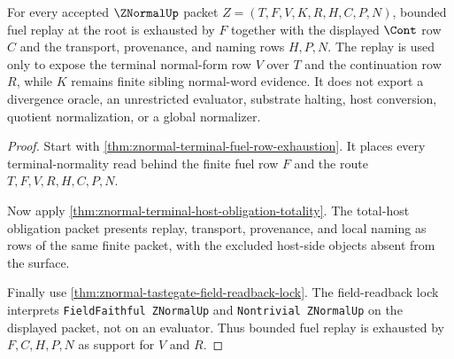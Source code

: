 \begin{theorem}
\label{thm:znormal-root-fuel-replay-exhaustion}
For every accepted $\ZNormalUp$ packet $Z=(T,F,V,K,R,H,C,P,N)$, bounded fuel replay at the root is exhausted by $F$ together with the displayed $\Cont$ row $C$ and the transport, provenance, and naming rows $H,P,N$. The replay is used only to expose the terminal normal-form row $V$ over $T$ and the continuation row $R$, while $K$ remains finite sibling normal-word evidence. It does not export a divergence oracle, an unrestricted evaluator, substrate halting, host conversion, quotient normalization, or a global normalizer.
\end{theorem}
\begin{proof}
Start with \autoref{thm:znormal-terminal-fuel-row-exhaustion}. It places every terminal-normality read behind the finite fuel row $F$ and the route $T,F,V,R,H,C,P,N$.

Now apply \autoref{thm:znormal-terminal-host-obligation-totality}. The total-host obligation packet presents replay, transport, provenance, and local naming as rows of the same finite packet, with the excluded host-side objects absent from the surface.

Finally use \autoref{thm:znormal-tastegate-field-readback-lock}. The field-readback lock interprets \texttt{FieldFaithful ZNormalUp} and \texttt{Nontrivial ZNormalUp} on the displayed packet, not on an evaluator. Thus bounded fuel replay is exhausted by $F,C,H,P,N$ as support for $V$ and $R$.
\end{proof}

